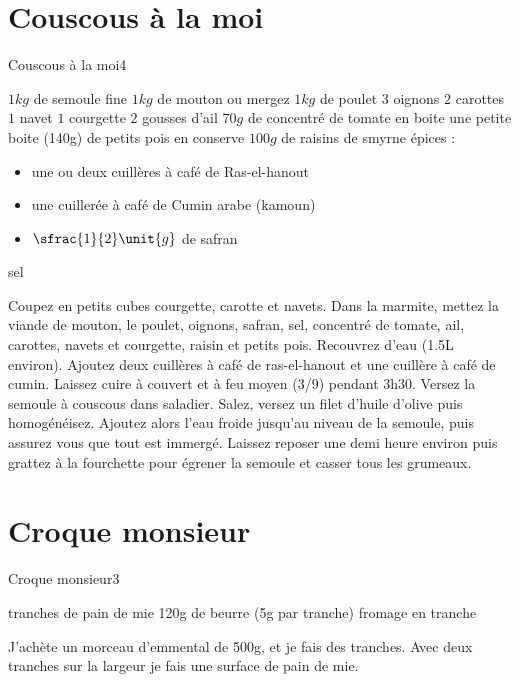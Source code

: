 {\section{Couscous à la moi}
\begin{recette}{Couscous à la moi}{4}{}{}
\begin{ingredients}[8 pers.]
\ingredient $1\unit{kg}$ de semoule fine
\ingredient $1\unit{kg}$ de mouton ou mergez
\ingredient $1\unit{kg}$ de poulet
\ingredient $3$ oignons
\ingredient $2$ carottes
\ingredient $1$ navet
\ingredient $1$ courgette
\ingredient $2$ gousses d'ail
\ingredient $70\unit{g}$ de concentré de tomate en boite
\ingredient une petite boite (140g) de petits pois en conserve
\ingredient $100\unit{g}$ de raisins de smyrne
\ingredient épices : \begin{itemize}
		\item une ou deux cuillères à café de Ras-el-hanout
		\item une cuillerée à café de Cumin arabe (kamoun)
		\item $\sfrac{1}{2}\unit{g}$ de safran
		\end{itemize}
\ingredient sel
\end{ingredients}

\begin{preparation}
\etape Coupez en petits cubes courgette, carotte et navets.
\etape Dans la marmite, mettez la viande de mouton, le poulet, oignons, safran, sel, concentré de tomate, ail, carottes, navets et courgette, raisin et petits pois. 
Recouvrez d'eau (1.5L environ). Ajoutez deux cuillères à café de ras-el-hanout et une cuillère à café de cumin. Laissez cuire à couvert et à feu moyen (3/9) pendant 3h30.
\etape Versez la semoule à couscous dans saladier. Salez, versez un filet d'huile d'olive puis homogénéisez. Ajoutez alors 
l'eau froide jusqu'au niveau de la semoule, puis assurez vous que tout est immergé. Laissez reposer une demi heure environ 
puis grattez à la fourchette pour égrener la semoule et casser tous les grumeaux.
\end{preparation}
\end{recette}


\section{Croque monsieur}
\begin{recette}{Croque monsieur}{3}{}{}
\begin{ingredients}
 tranches de pain de mie
\ingredient 120g de beurre (5g par tranche)
\ingredient fromage en tranche
\begin{remarque}
J'achète un morceau d'emmental de 500g, et je fais des tranches. Avec deux tranches sur la largeur je fais une surface de pain 
de mie.
\end{remarque}


\end{ingredients}
\end{recette}}
